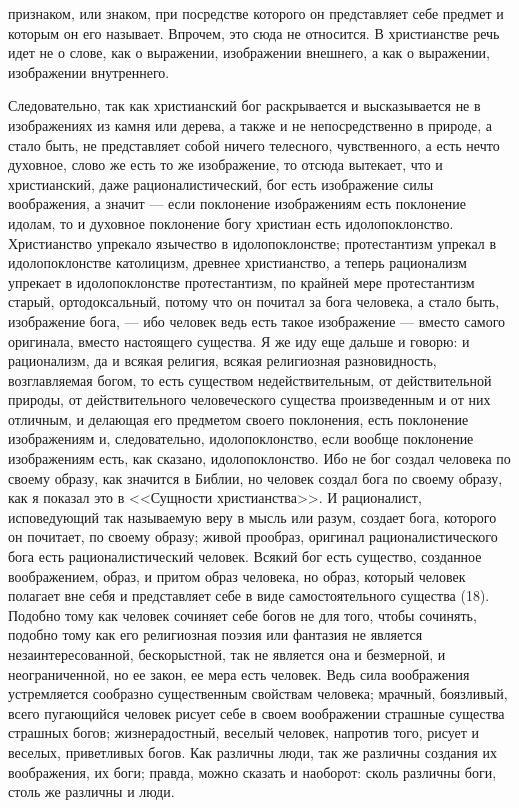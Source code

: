 \documentclass[12pt]{article}
\begin{document}
признаком, или знаком, при посредстве которого он представляет себе предмет и которым он его называет. Впрочем, это сюда не относится. В христианстве речь идет не о слове, как о выражении, изображении внешнего, а как о выражении, изображении внутреннего. 

Следовательно, так как христианский бог раскрывается и высказывается не в изображениях из камня или дерева, а также и не непосредственно в природе, а стало быть, не представляет собой ничего телесного, чувственного, а есть нечто духовное, слово же есть то же изображение, то отсюда вытекает, что и христианский, даже рационалистический, бог есть изображение силы воображения, а значит --- если поклонение изображениям есть поклонение идолам, то и духовное поклонение богу христиан есть идолопоклонство. Христианство упрекало язычество в идолопоклонстве; протестантизм упрекал в идолопоклонстве католицизм, древнее христианство, а теперь рационализм упрекает в идолопоклонстве протестантизм, по крайней мере протестантизм старый, ортодоксальный, потому что он почитал за бога человека, а стало быть, изображение бога, --- ибо человек ведь есть такое изображение --- вместо самого оригинала, вместо настоящего существа. Я же иду еще дальше и говорю: и рационализм, да и всякая религия, всякая религиозная разновидность, возглавляемая богом, то есть существом недействительным, от действительной природы, от действительного человеческого существа произведенным и от них отличным, и делающая его предметом своего поклонения, есть поклонение изображениям и, следовательно, идолопоклонство, если вообще поклонение изображениям есть, как сказано, идолопоклонство. Ибо не бог создал человека по своему образу, как значится в Библии, но человек создал бога по своему образу, как я показал это в <<Сущности христианства>>. И рационалист, исповедующий так называемую веру в мысль или разум, создает бога, которого он почитает, по своему образу; живой прообраз, оригинал рационалистического бога есть рационалистический человек. Всякий бог есть существо, созданное воображением, образ, и притом образ человека, но образ, который человек полагает вне себя и представляет себе в виде самостоятельного существа (18). Подобно тому как человек сочиняет себе богов не для того, чтобы сочинять, подобно тому как его религиозная поэзия или фантазия не является незаинтересованной, бескорыстной, так не является она и безмерной, и неограниченной, но ее закон, ее мера есть человек. Ведь сила воображения устремляется сообразно существенным свойствам человека; мрачный, боязливый, всего пугающийся человек рисует себе в своем воображении страшные существа страшных богов; жизнерадостный, веселый человек, напротив того, рисует и веселых, приветливых богов. Как различны люди, так же различны создания их воображения, их боги; правда, можно сказать и наоборот: сколь различны боги, столь же различны и люди. 
\end{document}
